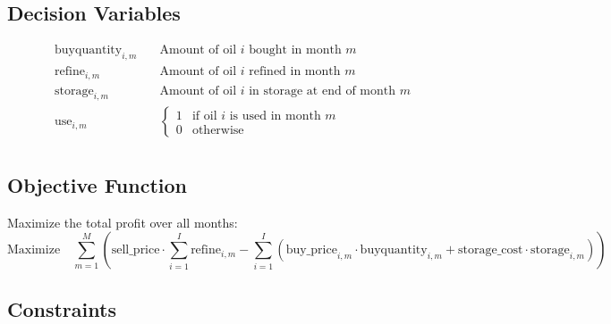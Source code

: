 \documentclass{article}
\begin{document}
\subsection*{Decision Variables}
\begin{align*}
\text{buyquantity}_{i, m} & \quad \text{Amount of oil } i \text{ bought in month } m \\
\text{refine}_{i, m} & \quad \text{Amount of oil } i \text{ refined in month } m \\
\text{storage}_{i, m} & \quad \text{Amount of oil } i \text{ in storage at end of month } m \\
\text{use}_{i, m} & \quad \begin{cases}
1 & \text{if oil } i \text{ is used in month } m \\
0 & \text{otherwise}
\end{cases} \\
\end{align*}

\subsection*{Objective Function}
Maximize the total profit over all months:
\[
\text{Maximize} \quad \sum_{m=1}^{M} \left( \text{sell\_price} \cdot \sum_{i=1}^{I} \text{refine}_{i, m} - \sum_{i=1}^{I} \left(\text{buy\_price}_{i, m} \cdot \text{buyquantity}_{i, m} + \text{storage\_cost} \cdot \text{storage}_{i, m} \right) \right)
\]

\subsection*{Constraints}
\end{document}
